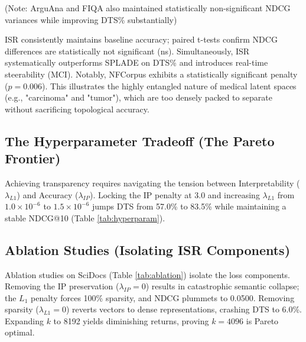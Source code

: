 \documentclass[sigconf,authordraft]{acmart}
\begin{document}
(Note: ArguAna and FIQA also maintained statistically non-significant NDCG variances while improving DTS\% substantially)

ISR consistently maintains baseline accuracy; paired t-tests confirm NDCG differences are statistically not significant (ns). Simultaneously, ISR systematically outperforms SPLADE on DTS\% and introduces real-time steerability (MCI). Notably, NFCorpus exhibits a statistically significant penalty ($p=0.006$). This illustrates the highly entangled nature of medical latent spaces (e.g., "carcinoma" and "tumor"), which are too densely packed to separate without sacrificing topological accuracy.

\subsection{The Hyperparameter Tradeoff (The Pareto Frontier)}
Achieving transparency requires navigating the tension between Interpretability ($\lambda_{L1}$) and Accuracy ($\lambda_{IP}$). Locking the IP penalty at 3.0 and increasing $\lambda_{L1}$ from $1.0\times 10^{-6}$ to $1.5\times 10^{-6}$ jumps DTS from 57.0\% to 83.5\% while maintaining a stable NDCG@10 (Table \ref{tab:hyperparam}).

\begin{table}[htbp]
\centering
\caption{Hyperparameter Tradeoff Analysis (SciDocs)}
\label{tab:hyperparam}
\end{table}

\subsection{Ablation Studies (Isolating ISR Components)}
Ablation studies on SciDocs (Table \ref{tab:ablation}) isolate the loss components. Removing the IP preservation ($\lambda_{IP}=0$) results in catastrophic semantic collapse; the $L_1$ penalty forces 100\% sparsity, and NDCG plummets to 0.0500. Removing sparsity ($\lambda_{L1}=0$) reverts vectors to dense representations, crashing DTS to 6.0\%. Expanding $k$ to 8192 yields diminishing returns, proving $k=4096$ is Pareto optimal.
\end{document}
